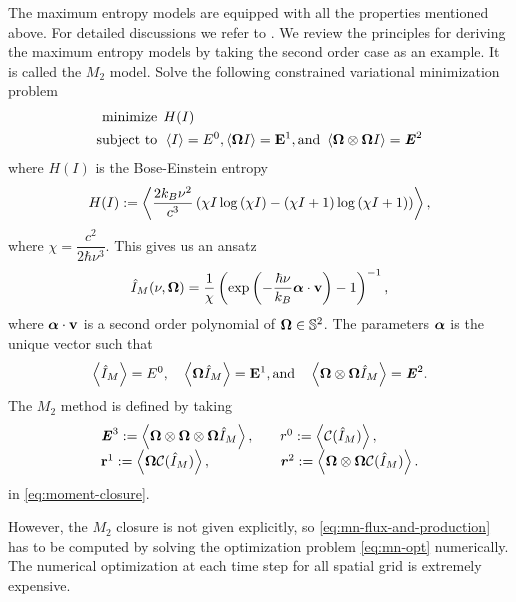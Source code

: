 The maximum entropy models are equipped with all the properties
mentioned above.  For detailed discussions we refer to
\cite{junk2000maximum, levermore1996moment,Dubroca-Feugas-1999}.  We
review the principles for deriving the maximum entropy models by
taking the second order case as an example. It is called the
$M_2$ model.  Solve the following constrained variational minimization
problem
\begin{equation}
\label{eq:mn-opt}
\begin{split}
  \minimize \:\:  & H(I)\\
 \st \:\: & \Vint{ I }= E^0, \Vint{\bOmega I} = \bE^1, 
 \text{and } \Vint{\bOmega \otimes \bOmega I} = \bbrE^2
\end{split}
\end{equation}
where $H(I)$ is the Bose-Einstein entropy
\begin{equation}\label{eq:be-entropy}
 H(I) := \Vint{\frac{2 k_B \nu^2}{c^3} \left(
  \chi I \log \left( \chi I \right)
  - \left(\chi I + 1 \right) \log \left( \chi I + 1 \right)
  \right)},
\end{equation}
where $\chi = \dfrac{c^2}{2 \hbar \nu^3}$.  This gives us an ansatz
\begin{equation}\label{eq:be-ansatz}
 \mansatz(\nu, \bOmega) =
  \dfrac{1}{\chi} \left( \exp \left( -\dfrac{\hbar \nu}{k_B}
    \bsalpha\cdot\bv \right)-1 \right)^{-1},
\end{equation}
where $\boldsymbol{\alpha} \cdot \mathbf{v} $ is a second order polynomial of
$\boldsymbol{\Omega} \in \mathbb{S}^2$.  The parameters $\boldsymbol{\alpha}$ is the unique vector
such that
$$\left\langle  \hat I_M \right\rangle = E^0, \quad 
\left\langle \boldsymbol{\Omega} \hat I_M \right\rangle = \mathbf{E}^1,
\text{and} \quad 
\left\langle \boldsymbol{\Omega} \otimes \boldsymbol{\Omega} \hat I_M \right\rangle = \boldsymbol{\mathit{E}}^2.
$$
The $M_2$ method is defined by taking
\begin{equation}\label{eq:mn-flux-and-production}
  \begin{array}{ll}
    \bbrE^3 := \Vint{\bOmega \otimes \bOmega \otimes \bOmega \mansatz},
    \quad & r^0 := \Vint{ \cC (\mansatz)},\\
    \br^1 := \Vint{ \bOmega \cC (\mansatz)}, \quad
    & \bbr^2 := \Vint{ \bOmega \otimes \bOmega \cC
    (\mansatz)}.
  \end{array}
\end{equation}
in \eqref{eq:moment-closure}.

However, the $M_2$ closure is not given explicitly, so
\eqref{eq:mn-flux-and-production} has to be computed by solving the
optimization problem \eqref{eq:mn-opt} numerically. The numerical
optimization at each time step for all spatial grid is extremely 
expensive.

